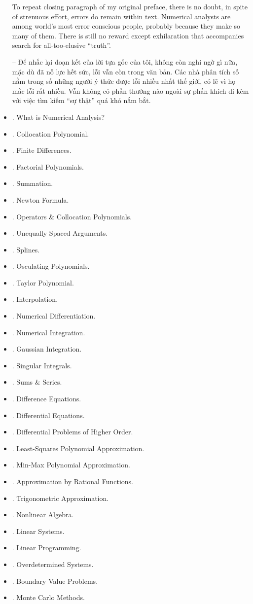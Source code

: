 \documentclass{article}
\begin{document}
\begin{itemize}
	To repeat closing paragraph of my original preface, there is no doubt, in spite of strenuous effort, errors do remain within text. Numerical analysts are among world's most error conscious people, probably because they make so many of them. There is still no reward except exhilaration that accompanies search for all-too-elusive ``truth''.
	
	-- Để nhắc lại đoạn kết của lời tựa gốc của tôi, không còn nghi ngờ gì nữa, mặc dù đã nỗ lực hết sức, lỗi vẫn còn trong văn bản. Các nhà phân tích số nằm trong số những người ý thức được lỗi nhiều nhất thế giới, có lẽ vì họ mắc lỗi rất nhiều. Vẫn không có phần thưởng nào ngoài sự phấn khích đi kèm với việc tìm kiếm ``sự thật'' quá khó nắm bắt.
	\item {. What is Numerical Analysis?}
	\item {. Collocation Polynomial.}
	\item {. Finite Differences.}
	\item {. Factorial Polynomials.}
	\item {. Summation.}
	\item {. Newton Formula.}
	\item {. Operators \& Collocation Polynomials.}
	\item {. Unequally Spaced Arguments.}
	\item {. Splines.}
	\item {. Osculating Polynomials.}
	\item {. Taylor Polynomial.}
	\item {. Interpolation.}
	\item {. Numerical Differentiation.}
	\item {. Numerical Integration.}
	\item {. Gaussian Integration.}
	\item {. Singular Integrals.}
	\item {. Sums \& Series.}
	\item {. Difference Equations.}
	\item {. Differential Equations.}
	\item {. Differential Problems of Higher Order.}
	\item {. Least-Squares Polynomial Approximation.}
	\item {. Min-Max Polynomial Approximation.}
	\item {. Approximation by Rational Functions.}
	\item {. Trigonometric Approximation.}
	\item {. Nonlinear Algebra.}
	\item {. Linear Systems.}
	\item {. Linear Programming.}
	\item {. Overdetermined Systems.}
	\item {. Boundary Value Problems.}
	\item {. Monte Carlo Methods.}
\end{itemize}
\end{document}
